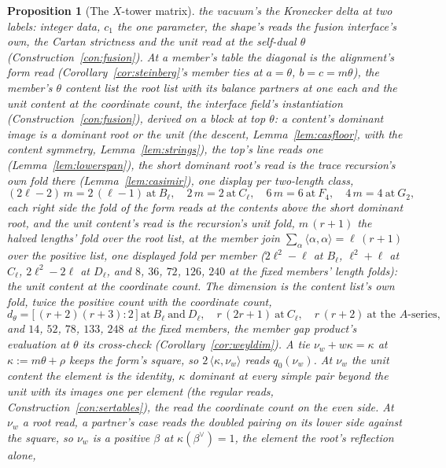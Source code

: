 \documentclass[11pt]{article}
\newtheorem{proposition}{Proposition}
\theoremstyle{definition}
\begin{document}
\begin{proposition}[The $X$-tower matrix]
the vacuum's the Kronecker delta at two labels: integer data, $c_1$ the
one parameter, the shape's reads the fusion interface's own, the
Cartan strictness and the unit read at the self-dual $\theta$
(Construction~\ref{con:fusion}).
At a member's table the diagonal is the alignment's form read
(Corollary~\ref{cor:steinberg}'s member ties at $a=\theta$,
$b=c=m\theta$), the member's $\theta$ content list the root list
with its balance partners at one each and the unit content at
the coordinate count, the interface field's instantiation
(Construction~\ref{con:fusion}), derived on a block at top
$\theta$: a content's dominant image is a dominant root or the
unit (the descent, Lemma~\ref{lem:casfloor}, with the content
symmetry, Lemma~\ref{lem:strings}), the top's line reads one
(Lemma~\ref{lem:lowerspan}), the short dominant root's read is
the trace recursion's own fold there (Lemma~\ref{lem:casimir}),
one display per two-length class,
\[
(2\ell{-}2)\,m=2\,(\ell{-}1)\ \text{at}\ B_\ell,\quad
2\,m=2\ \text{at}\ C_\ell,\quad
6\,m=6\ \text{at}\ F_4,\quad
4\,m=4\ \text{at}\ G_2,
\]
each right side the fold of the form reads at the contents above
the short dominant root, and the unit content's read is the
recursion's unit fold, $m\,(r+1)$ the halved lengths' fold over
the root list, at the member join
$\sum_{\alpha}\langle\alpha,\alpha\rangle=\ell\,(r+1)$ over the
positive list, one displayed fold per member ($2\ell^2{-}\ell$
at $B_\ell$, $\ell^2{+}\ell$ at $C_\ell$, $2\ell^2{-}2\ell$ at
$D_\ell$, and $8$, $36$, $72$, $126$, $240$ at the fixed
members' length folds): the unit content at the coordinate
count. The dimension is the content list's own fold,
twice the positive count with the coordinate count,
\[
d_\theta=\big[\,(r+2)(r+3):2\,\big]\ \text{at}\ B_\ell\
\text{and}\ D_\ell,\quad r\,(2r+1)\ \text{at}\ C_\ell,\quad
r\,(r+2)\ \text{at the $A$-series},
\]
and $14$, $52$, $78$, $133$, $248$ at the fixed members, the
member gap product's evaluation at $\theta$ its cross-check
(Corollary~\ref{cor:weyldim}). A tie
$\nu_w+w\kappa=\kappa$ at $\kappa:=m\theta+\rho$ keeps the
form's square, so $2\,\langle\kappa,\nu_w\rangle$ reads
$q_0(\nu_w)$. At $\nu_w$ the unit content the element is
the identity, $\kappa$ dominant at every simple pair beyond the
unit with its images one per element (the regular reads,
Construction~\ref{con:sertables}), the read the coordinate count
on the even side. At $\nu_w$ a root read, a partner's case reads
the doubled pairing on its lower side against the square, so
$\nu_w$ is a positive $\beta$ at
$\kappa(\beta^\vee)=1$, the element the root's reflection alone,

\end{proposition}
\end{document}
